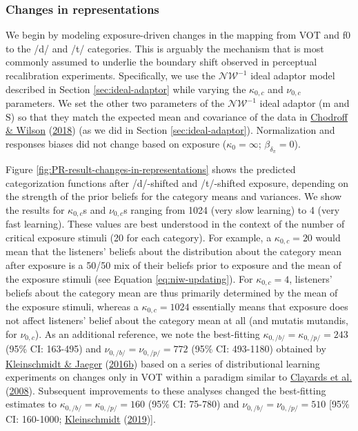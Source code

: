 \documentclass[
  11pt,
  english,
  man,floatsintext]{apa6}
\begin{document}
\hypertarget{changes-in-representations}{%
\subsubsection{Changes in representations}\label{changes-in-representations}}

We begin by modeling exposure-driven changes in the mapping from VOT and f0 to the /d/ and /t/ categories. This is arguably the mechanism that is most commonly assumed to underlie the boundary shift observed in perceptual recalibration experiments. Specifically, we use the \(\mathcal{NW}^{-1}\) ideal adaptor model described in Section \ref{sec:ideal-adaptor} while varying the \(\kappa_{0,c}\) and \(\nu_{0,c}\) parameters. We set the other two parameters of the \(\mathcal{NW}^{-1}\) ideal adaptor (\(\mathrm{m}\) and \(\mathrm{S}\)) so that they match the expected mean and covariance of the data in \protect\hyperlink{ref-chodroff-wilson2018}{Chodroff \& Wilson} (\protect\hyperlink{ref-chodroff-wilson2018}{2018}) (as we did in Section \ref{sec:ideal-adaptor}). Normalization and responses biases did not change based on exposure (\(\kappa_0 = \infty\); \(\beta_{\delta_\pi}=0\)).

Figure \ref{fig:PR-result-changes-in-representations} shows the predicted categorization functions after /d/-shifted and /t/-shifted exposure, depending on the strength of the prior beliefs for the category means and variances. We show the results for \(\kappa_{0,c}\)s and \(\nu_{0,c}\)s ranging from 1024 (very slow learning) to 4 (very fast learning). These values are best understood in the context of the number of critical exposure stimuli (20 for each category). For example, a \(\kappa_{0,c}=20\) would mean that the listeners' beliefs about the distribution about the category mean after exposure is a 50/50 mix of their beliefs prior to exposure and the mean of the exposure stimuli (see Equation \eqref{eq:niw-updating}). For \(\kappa_{0,c}=4\), listeners' beliefs about the category mean are thus primarily determined by the mean of the exposure stimuli, whereas a \(\kappa_{0,c}=1024\) essentially means that exposure does not affect listeners' belief about the category mean at all (and mutatis mutandis, for \(\nu_{0,c}\)). As an additional reference, we note the best-fitting \(\kappa_{0,/b/}=\kappa_{0,/p/}=243\) (95\% CI: 163-495) and \(\nu_{0,/b/}=\nu_{0,/p/}=772\) (95\% CI: 493-1180) obtained by \protect\hyperlink{ref-kleinschmidt-jaeger2016cogsci}{Kleinschmidt \& Jaeger} (\protect\hyperlink{ref-kleinschmidt-jaeger2016cogsci}{2016b}) based on a series of distributional learning experiments on changes only in VOT within a paradigm similar to \protect\hyperlink{ref-clayards2008}{Clayards et al.} (\protect\hyperlink{ref-clayards2008}{2008}). Subsequent improvements to these analyses changed the best-fitting estimates to \(\kappa_{0,/b/}=\kappa_{0,/p/}=160\) (95\% CI: 75-780) and \(\nu_{0,/b/}=\nu_{0,/p/}=510\) {[}95\% CI: 160-1000; \protect\hyperlink{ref-kleinschmidt2019}{Kleinschmidt} (\protect\hyperlink{ref-kleinschmidt2019}{2019}){]}.
\end{document}
